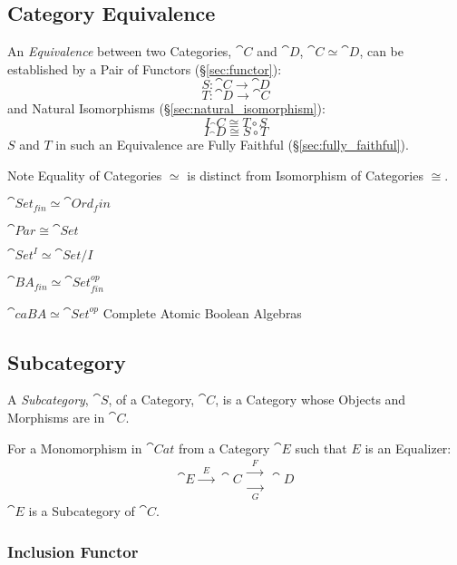 \subsection{Category Equivalence}\label{sec:category_equivalence}

An \emph{Equivalence} between two Categories, $\cat{C}$ and
$\cat{D}$, $\cat{C} \simeq \cat{D}$, can be established by a
Pair of Functors (\S\ref{sec:functor}):
\[
  S : \cat{C} \rightarrow \cat{D}
\]\[
  T : \cat{D} \rightarrow \cat{C}
\]
and Natural Isomorphisms (\S\ref{sec:natural_isomorphism}):
\[
  I_\cat{C} \cong T \circ S
\]\[
  I_\cat{D} \cong S \circ T
\]
$S$ and $T$ in such an Equivalence are Fully Faithful
(\S\ref{sec:fully_faithful}).

\fist Note Equality of Categories $\simeq$ is distinct from
Isomorphism of Categories $\cong$.

$\cat{Set}_{fin} \simeq \cat{Ord}_fin$

$\cat{Par} \cong \cat{Set}$

$\cat{Set}^I \simeq \cat{Set}/I$

$\cat{BA}_{fin} \simeq \cat{Set}_{fin}^{op}$

$\cat{caBA} \simeq \cat{Set}^{op}$ Complete Atomic Boolean
Algebras %



\subsection{Subcategory}\label{sec:subcategory}

A \emph{Subcategory}, $\cat{S}$, of a Category, $\cat{C}$, is a
Category whose Objects and Morphisms are in $\cat{C}$.

For a Monomorphism in $\cat{Cat}$ from a Category $\cat{E}$ such
that $E$ is an Equalizer:
\[
  \cat{E} \xrightarrow{\;\;E\;\;} \cat{C}
  \begin{matrix}
  \xrightarrow{\;\;F\;\;}\\
  \xrightarrow[\;\;G\;\;]{}
  \end{matrix}
  \cat{D}
\]
$\cat{E}$ is a Subcategory of $\cat{C}$.



\subsubsection{Inclusion Functor}\label{sec:inclusion_functor}

